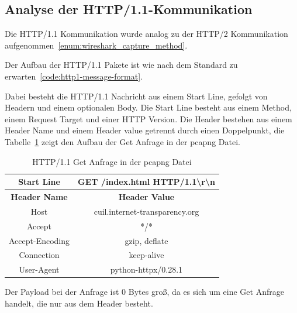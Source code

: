 \FloatBarrier
\subsection{Analyse der HTTP/1.1-Kommunikation}

Die HTTP/1.1 Kommunikation wurde analog zu der HTTP/2 Kommunikation aufgenommen~\ref{enum:wireshark_capture_method}.

Der Aufbau der HTTP/1.1 Pakete ist wie nach dem Standard zu erwarten~\ref{code:http1-message-format}.


Dabei besteht die HTTP/1.1 Nachricht aus einem Start Line, gefolgt von Headern und einem optionalen Body.
Die Start Line besteht aus einem Method, einem Request Target und einer HTTP Version.
Die Header bestehen aus einem Header Name und einem Header value getrennt durch einen Doppelpunkt, die Tabelle~\ref{tab:http11-header-request} zeigt den Aufbau der Get Anfrage in der pcapng Datei.

\begin{table}[h]
    \centering
    \begin{tabular}{|c|c|}
        \hline
        \textbf{Start Line} & GET /index.html HTTP/1.1\textbackslash r\textbackslash n \\
        \hline
        \textbf{Header Name} & \textbf{Header Value} \\
        \hline
        Host & cuil.internet-transparency.org \\
        Accept & */* \\
        Accept-Encoding & gzip, deflate \\
        Connection & keep-alive \\
        User-Agent & python-httpx/0.28.1 \\
        \hline
    \end{tabular}
    \caption{HTTP/1.1 Get Anfrage in der pcapng Datei}\label{tab:http11-header-request}
\end{table}

Der Payload bei der Anfrage ist 0 Bytes groß, da es sich um eine Get Anfrage handelt, die nur aus dem Header besteht.

